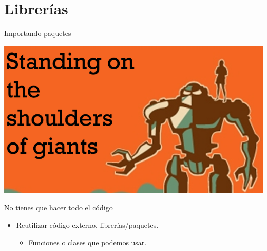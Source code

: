 \documentclass[bigger,unknownkeysallowed]{beamer}
\begin{document}
\section{Librerías}
\label{sec:org4a5a62d}
\begin{frame}[label={sec:org6683006}]{Importando paquetes}
\begin{center}
\begin{center}
\includegraphics[width=.6\textwidth]{standing.png}
\end{center}
\end{center}



\begin{block}{No tienes que hacer todo el código}
\begin{itemize}
\item Reutilizar código externo, librerías/paquetes.

\begin{itemize}
\item Funciones o clases que podemos usar.
\end{itemize}
\end{itemize}
\end{block}
\end{frame}
\end{document}

